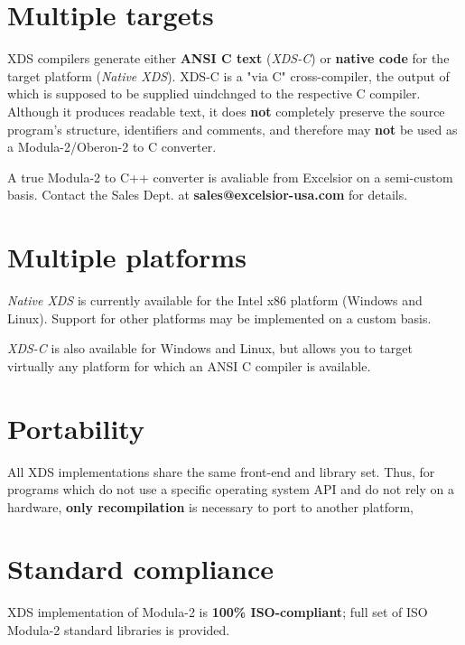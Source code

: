\section{Multiple targets}
\label{feat:targets}

   XDS compilers generate either {\bf ANSI C text} ({\em XDS-C}) or 
   {\bf native code} for the target platform ({\em Native XDS}).
   XDS-C is a "via C" cross-compiler, the output of which is
   supposed to be supplied uindchnged to the respective C compiler.
   Although it produces readable text, it does {\bf not}
   completely preserve the source program's
   structure, identifiers and comments, and therefore may {\bf not}
   be used as a Modula-2/Oberon-2 to C converter.

   A true Modula-2 to C++ converter is avaliable from Excelsior
   on a semi-custom basis. Contact the Sales Dept. at
   {\bf sales@excelsior-usa.com} for details.

\section{Multiple platforms}
\label{feat:platforms}

   {\em Native XDS} is currently available for the Intel x86 platform
   (Windows and Linux). Support for other
   platforms may be implemented on a custom basis.
   
   {\em XDS-C} is also available for Windows and Linux, but
   allows you to target virtually any platform for 
   which an ANSI C compiler is available.

\section{Portability}
\label{feat:portability}

   All XDS implementations share the same front-end and library
   set. Thus, for programs which do not use a specific operating system API
   and do not rely on a hardware, {\bf only recompilation} is necessary 
   to port to another platform,

\section{Standard compliance}
\label{feat:standard}

   XDS implementation of Modula-2 is {\bf 100\% ISO-compliant};
   full set of ISO Modula-2 standard libraries is provided.

